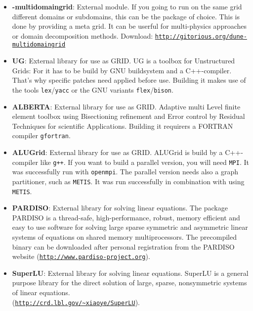 \begin{itemize}
\item \textbf{\Dune-multidomaingrid}: External module. If you going to run on the same grid different domains or subdomains,
this can be the package of choice. This is done by providing a meta grid. It can be userful for multi-physics approaches or domain decomposition methods. Download: \texttt{\url{http://gitorious.org/dune-multidomaingrid}}

\item \textbf{UG}: External library for use as GRID. UG is a toolbox for Unstructured Grids: For \Dumux it has to be build by GNU buildsystem and a C++-compiler. That's why \Dune specific patches need applied before use. Building it makes use of the tools \texttt{lex}/\texttt{yacc} or the GNU variants \texttt{flex}/\texttt{bison}. 

\item \textbf{ALBERTA}: External library for use as GRID. Adaptive multi Level finite element toolbox using Bisectioning refinement and Error control by Residual Techniques for scientific Applications. Building it requirers a FORTRAN compiler \texttt{gfortran}.

\item \textbf{ALUGrid}: External library for use as GRID. ALUGrid is build by a C++-compiler like \texttt{g++}. If you want to build a parallel version, you will need \texttt{MPI}. It was successfully run with \texttt{openmpi}. The parallel version needs also a graph partitioner, such as \texttt{METIS}. It was run successfully in combination with \Dune using \texttt{METIS}.

\item \textbf{PARDISO}: External library for solving linear equations. The package PARDISO is a thread-safe, high-performance, robust, memory efficient and easy to use software for solving large sparse symmetric and asymmetric linear systems of equations on shared memory multiprocessors. The precompiled binary can be downloaded after personal registration from the PARDISO website (\texttt{\url{http://www.pardiso-project.org}}).

\item \textbf{SuperLU}: External library for solving linear equations. SuperLU is a general purpose library for the direct solution of large, sparse, nonsymmetric systems of linear equations. \\ (\texttt{\url{http://crd.lbl.gov/~xiaoye/SuperLU}}).

\end{itemize}

